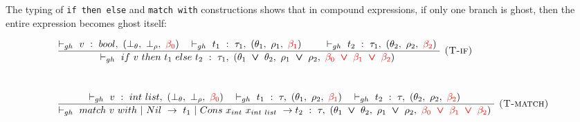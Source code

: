 \documentclass[a4paper,11pt,oneside]{article}
\theoremstyle{plain}
\newcommand{\rouge}[1]{\textcolor{red}{#1}}
\newcommand{\bvee}{\boldsymbol{~\vee~}}
\newcommand{\ghosttyping}[6]{\vdash_{gh}~#1~:~#2,~(#3,~#4,~\rouge{#5})~\textcolor{blue}{\boldsymbol{#6}}}
\newcommand{\bth}{\bot_\theta}
\newcommand{\brh}{\bot_\rho}
\newcommand{\gba}[1]{\beta_{#1}}
\newcommand{\gbra}[1]{\textcolor{red}{\gba{#1}}}
\begin{document}
The typing of \texttt{if~then~else} and \texttt{match~with} constructions shows
that in compound expressions, if only one branch is ghost, then the entire expression becomes ghost itself:
\begin{footnotesize}
\begin{displaymath}
\begin{array}{l}
	\dfrac
	{
		\ghosttyping{v}{bool}{\bth}{\brh}{\gbra{0}}{} ~~
		\ghosttyping{t_1}{\tau_1}{\theta_1}{\rho_1}{\gbra{1}}{} \qquad
		\ghosttyping{t_2}{\tau_1}{\theta_2}{\rho_2}{\gbra{2}}{}
	}
	{	\ghosttyping{if~v~then~t_1~else~t_2}
		{\tau_1}{\theta_1 \bvee \theta_2}{\rho_1 \bvee \rho_2}
		{\gbra{0} \bvee \gbra{1} \bvee \gbra{2}}{}}
	{\textsc{  (T-if)}}	\\[1.3cm]	
		
\dfrac
	{\ghosttyping{v}{int~list}{\bth}{\brh}{\gbra{0}}{} ~~
	 \ghosttyping{t_1}{\tau}{\theta_1}{\rho_2}{\gbra{1}}{}  ~~
	 \ghosttyping{t_2}{\tau}{\theta_2}{\rho_2}{\gbra{2}}{}  }
	{\ghosttyping{match~v~with ~|~Nil~->~t_1~|~Cons~x_{int}~x_{int~list}~->t_2}{\tau}{\theta_1 \bvee \theta_2}
		{\rho_1 \bvee \rho_2}
		{\gbra{0} \bvee \gbra{1} \bvee \gbra{2}}{}} 
{\textsc{  (T-match)}}
\end{array}	
\end{displaymath}
\end{footnotesize}
\end{document}
